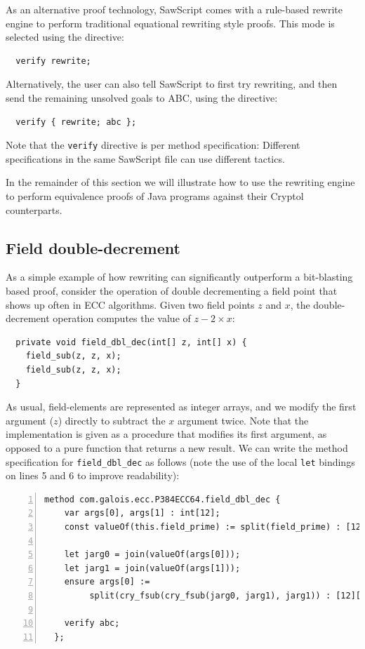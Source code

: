 \documentclass[12pt]{galois-whitepaper}
\newcommand{\sawScript}{{\sc SawScript}\xspace}
\begin{document}
As an alternative proof technology, \sawScript comes with a rule-based rewrite engine to perform
traditional equational rewriting style proofs. This mode is selected using the directive:
\begin{Verbatim}
  verify rewrite;
\end{Verbatim}
Alternatively, the user can also tell \sawScript to first try rewriting, and then send the remaining unsolved goals to ABC, using the directive:
\begin{Verbatim}
  verify { rewrite; abc };
\end{Verbatim}
Note that the {\tt verify} directive is per method specification: Different specifications in the same \sawScript file can use different tactics.

In the remainder of this section we will illustrate how to use the rewriting engine to perform equivalence proofs of Java programs against their
Cryptol counterparts.

\subsection{Field double-decrement}\label{sec:doubledec}
As a simple example of how rewriting can significantly outperform a bit-blasting based proof, consider the operation of double decrementing a
field point that shows up often in ECC algorithms.
Given two field points $z$ and $x$, the double-decrement operation computes the value of $z - 2\times x$:
\begin{Verbatim}
  private void field_dbl_dec(int[] z, int[] x) {
    field_sub(z, z, x);
    field_sub(z, z, x);
  }
\end{Verbatim}
As usual, field-elements are represented as integer arrays, and we modify the first argument ($z$) directly to subtract the $x$ argument twice.
Note that the implementation is given as a procedure that modifies its first argument, as opposed to a pure function that returns a new result.
We can write the method specification for {\tt field\_dbl\_dec} as follows (note the use of the local {\tt let} bindings on lines 5 and 6 to improve readability):

\begin{Verbatim}[numbers=left]
  method com.galois.ecc.P384ECC64.field_dbl_dec {
    var args[0], args[1] : int[12];
    const valueOf(this.field_prime) := split(field_prime) : [12][32];
  
    let jarg0 = join(valueOf(args[0]));
    let jarg1 = join(valueOf(args[1]));
    ensure args[0] :=
         split(cry_fsub(cry_fsub(jarg0, jarg1), jarg1)) : [12][32];

    verify abc;
  };
\end{Verbatim}
\end{document}
